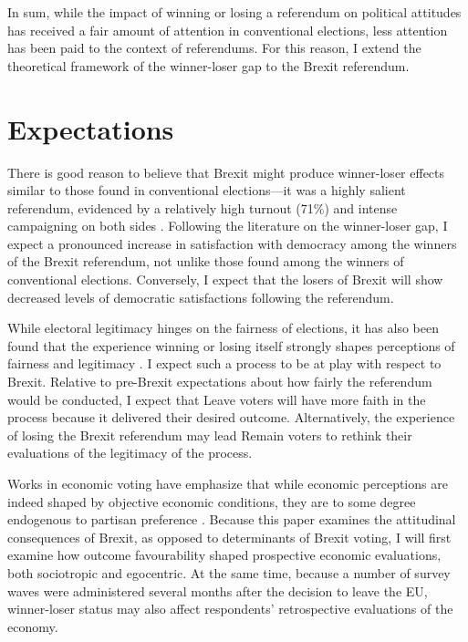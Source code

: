 \documentclass[12pt, letter]{article}
\begin{document}
In sum, while the impact of winning or losing a referendum on political attitudes has received a fair amount of attention in conventional elections, less attention has been paid to the context of referendums. For this reason, I extend the theoretical framework of the winner-loser gap to the Brexit referendum. 

\singlespacing
\section{Expectations}
\doublespacing

There is good reason to believe that Brexit might produce winner-loser effects similar to those found in conventional elections---it was a highly salient referendum, evidenced by a relatively high turnout (71\%) and intense campaigning on both sides \parencite{hobolt2016brexit}. Following the literature on the winner-loser gap, I expect a pronounced increase in satisfaction with democracy among the winners of the Brexit referendum, not unlike those found among the winners of conventional elections. Conversely, I expect that the losers of Brexit will show decreased levels of democratic satisfactions following the referendum. 

While electoral legitimacy hinges on the fairness of elections, it has also been found that the experience winning or losing itself strongly shapes perceptions of fairness and legitimacy \parencite{sances2015partisanship, nadeau1993accepting}. I expect such a process to be at play with respect to Brexit. Relative to pre-Brexit expectations about how fairly the referendum would be conducted, I expect that Leave voters will have more faith in the process because it delivered their desired outcome. Alternatively, the experience of losing the Brexit referendum may lead Remain voters to rethink their evaluations of the legitimacy of the process.

Works in economic voting have emphasize that while economic perceptions are indeed shaped by objective economic conditions, they are to some degree endogenous to partisan preference \parencite{lewis2013vp, evans2006political}. Because this paper examines the attitudinal consequences of Brexit, as opposed to determinants of Brexit voting, I will first examine how outcome favourability shaped prospective economic evaluations, both sociotropic and egocentric. At the same time, because a number of survey waves were administered several months after the decision to leave the EU, winner-loser status may also affect respondents' retrospective evaluations of the economy. 
\end{document}
